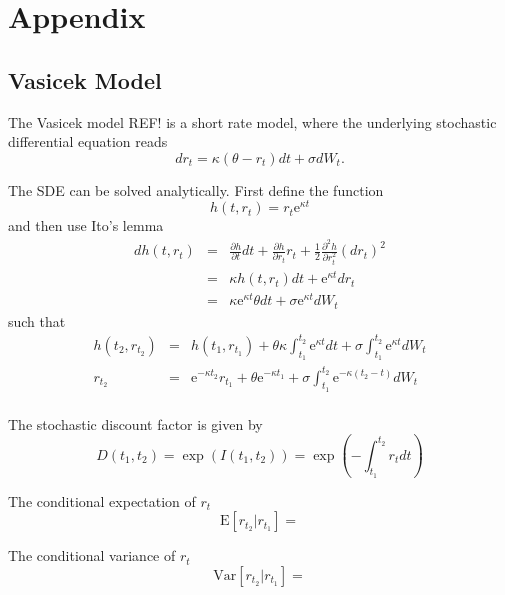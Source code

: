 \documentclass{report}
\newcommand{\E}{\mathrm{E}}
\newcommand{\Var}{\mathrm{Var}}
\begin{document}
\section{Appendix}

\subsection{Vasicek Model}
The Vasicek model REF! is a short rate model, where the underlying stochastic differential equation reads
\begin{equation}
dr_t = \kappa \left( \theta - r_t \right) dt + \sigma dW_t.
\end{equation}

The SDE can be solved analytically. First define the function
\begin{equation}
h(t, r_t) = r_t \text{e}^{\kappa t}
\end{equation}
and then use Ito's lemma
\begin{eqnarray}
dh(t, r_t) &=& \frac{\partial h}{\partial t} dt + \frac{\partial h}{\partial r_t} r_t + \frac{1}{2}\frac{\partial^2 h}{\partial r_t^2} \left(dr_t\right)^2 \\
&=& \kappa h(t, r_t) dt + \text{e}^{\kappa t} dr_t \\
&=& \kappa \text{e}^{\kappa t} \theta dt + \sigma \text{e}^{\kappa t} dW_t
\end{eqnarray}
such that
\begin{eqnarray}
h(t_2, r_{t_2}) &=& h(t_1, r_{t_1}) + \theta \kappa \int_{t_1}^{t_2} \text{e}^{\kappa t} dt + \sigma \int_{t_1}^{t_2} \text{e}^{\kappa t} dW_t \\
r_{t_2} &=& \text{e}^{-\kappa t_2} r_{t_1} + \theta \text{e}^{-\kappa t_1} + \sigma \int_{t_1}^{t_2} \text{e}^{-\kappa \left(t_2 - t\right)} dW_t \\
\end{eqnarray}

The stochastic discount factor is given by
\begin{equation}
D(t_{1}, t_{2}) = \exp \left( I(t_1, t_2) \right) = \exp \left( -\int_{t_1}^{t_2} r_t dt \right)
\end{equation}

The conditional expectation of $r_t$
\begin{equation}
\E \left[ r_{t_2} | r_{t_1} \right] = 
\end{equation}

The conditional variance of $r_t$
\begin{equation}
\Var \left[ r_{t_2} | r_{t_1} \right] = 
\end{equation}
\end{document}
